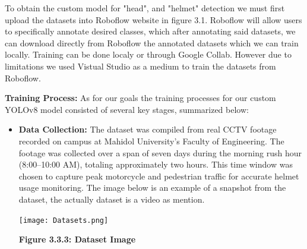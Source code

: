 To obtain the custom model for "head", and "helmet" detection we must first upload the datasets into Roboflow website in figure 3.1. Roboflow will allow users to specifically annotate desired classes, which after annotating said datasets, we can download directly from Roboflow the annotated datasets which we can train locally. Training can be done localy or through Google Collab. However due to limitations we used Vistual Studio as a medium to train the datasets from Roboflow. 

\newpage
	
\noindent\textbf{Training Process:} As for our goals the training processes for our custom YOLOv8 model consisted of several key stages, summarized below:

\begin{itemize}
	 \item \textbf{Data Collection:} The dataset was compiled from real CCTV footage recorded on campus at Mahidol University’s Faculty of Engineering. The footage was collected over a span of seven days during the morning rush hour (8:00–10:00 AM), totaling approximately two hours. This time window was chosen to capture peak motorcycle and pedestrian traffic for accurate helmet usage monitoring.  The image below is an example of a snapshot from the dataset, the actually dataset is a video as mention.
\begin{center}
	\texttt{[image: Datasets.png]}
	
	\vspace{0.5em}
	\textbf{Figure 3.3.3: Dataset Image}
\end{center}
	 

\end{itemize}
